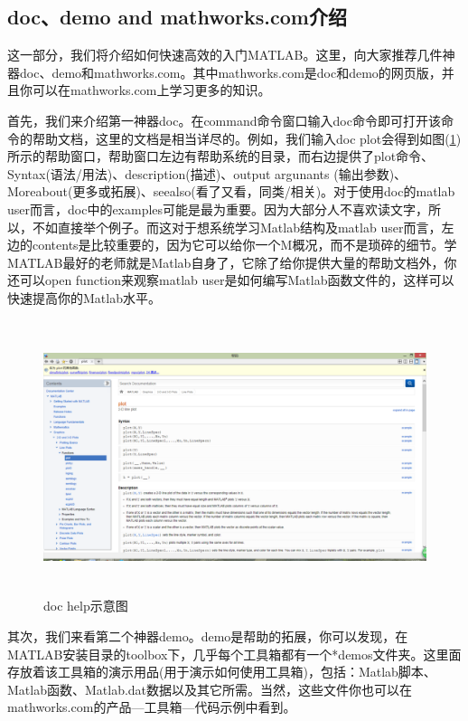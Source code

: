     \subsection{doc、demo and mathworks.com介绍}
        \par
        这一部分，我们将介绍如何快速高效的入门MATLAB。这里，向大家推荐几件神器doc、demo和mathworks.com。其中mathworks.com是doc和demo的网页版，并且你可以在mathworks.com上学习更多的知识。
        \par
        首先，我们来介绍第一神器doc。在command命令窗口输入doc命令即可打开该命令的帮助文档，这里的文档是相当详尽的。例如，我们输入doc plot会得到如图(\ref{doc help示意图}) 所示的帮助窗口，帮助窗口左边有帮助系统的目录，而右边提供了plot命令、Syntax(语法/用法)、description(描述)、output argunants (输出参数)、Moreabout(更多或拓展)、seealso(看了又看，同类/相关)。对于使用doc的matlab user而言，doc中的examples可能是最为重要。因为大部分人不喜欢读文字，所以，不如直接举个例子。而这对于想系统学习Matlab结构及matlab user而言，左边的contents是比较重要的，因为它可以给你一个M概况，而不是琐碎的细节。学MATLAB最好的老师就是Matlab自身了，它除了给你提供大量的帮助文档外，你还可以open function来观察matlab user是如何编写Matlab函数文件的，这样可以快速提高你的Matlab水平。
        \begin{figure}[H]
        \centering
        \includegraphics[height=8cm]{images/34.jpg}
        \caption{doc help示意图}
        \label{doc help示意图}
        \end{figure}
        \par
        其次，我们来看第二个神器demo。demo是帮助的拓展，你可以发现，在MATLAB安装目录的toolbox下，几乎每个工具箱都有一个*demos文件夹。这里面存放着该工具箱的演示用品(用于演示如何使用工具箱)，包括：Matlab脚本、Matlab函数、Matlab.dat数据以及其它所需。当然，这些文件你也可以在mathworks.com的产品—工具箱—代码示例中看到。
